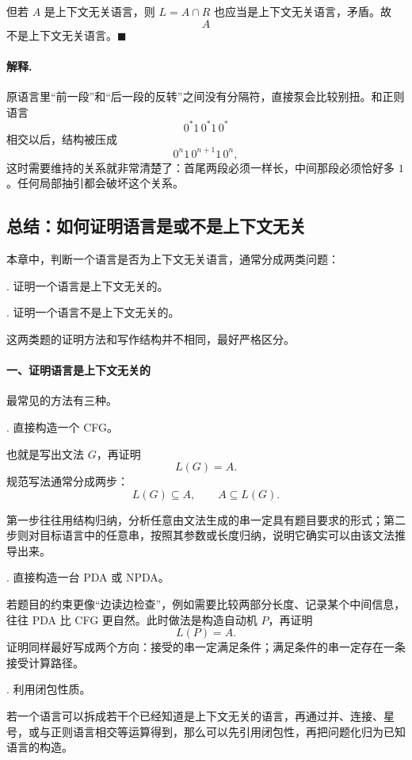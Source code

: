 \begin{answerred}
但若 $A$ 是上下文无关语言，则 $L=A\cap R$ 也应当是上下文无关语言，矛盾。故
\[
    A
\]
不是上下文无关语言。$\blacksquare$

\begin{answernote}
\paragraph{解释.}
原语言里“前一段”和“后一段的反转”之间没有分隔符，直接泵会比较别扭。和正则语言
\[
    0^*1\,0^*1\,0^*
\]
相交以后，结构被压成
\[
    0^n1\,0^{n+1}1\,0^n,
\]
这时需要维持的关系就非常清楚了：首尾两段必须一样长，中间那段必须恰好多 $1$。任何局部抽引都会破坏这个关系。

\subsection*{总结：如何证明语言是或不是上下文无关}

本章中，判断一个语言是否为上下文无关语言，通常分成两类问题：

\medskip
{}. 证明一个语言是上下文无关的。

\medskip
{}. 证明一个语言不是上下文无关的。

\medskip
这两类题的证明方法和写作结构并不相同，最好严格区分。

\paragraph{一、证明语言是上下文无关的}
最常见的方法有三种。

\medskip
{}. 直接构造一个 CFG。

也就是写出文法 $G$，再证明
\[
    L(G)=A.
\]
规范写法通常分成两步：
\[
    L(G)\subseteq A,\qquad A\subseteq L(G).
\]

第一步往往用结构归纳，分析任意由文法生成的串一定具有题目要求的形式；第二步则对目标语言中的任意串，按照其参数或长度归纳，说明它确实可以由该文法推导出来。

\medskip
{}. 直接构造一台 PDA 或 NPDA。

若题目的约束更像“边读边检查”，例如需要比较两部分长度、记录某个中间信息，往往 PDA 比 CFG 更自然。此时做法是构造自动机 $P$，再证明
\[
    L(P)=A.
\]
证明同样最好写成两个方向：接受的串一定满足条件；满足条件的串一定存在一条接受计算路径。

\medskip
{}. 利用闭包性质。

若一个语言可以拆成若干个已经知道是上下文无关的语言，再通过并、连接、星号，或与正则语言相交等运算得到，那么可以先引用闭包性，再把问题化归为已知语言的构造。


\end{answernote}
\end{answerred}
